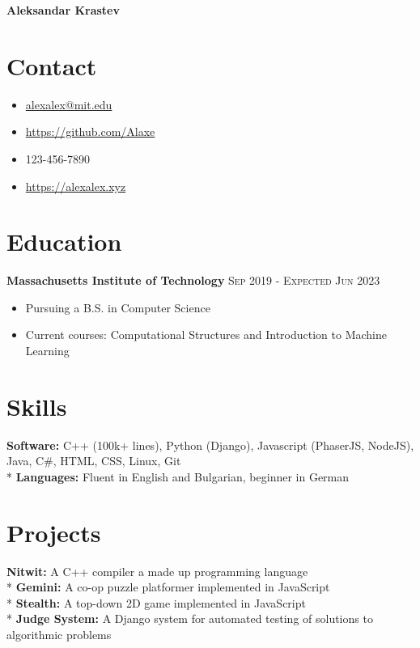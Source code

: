 \documentclass[letterpaper,11pt]{article}
\author{Aleksandar Krastev}
\date{2019-09-03}
\newcommand{\noskip}{\vspace{-\parskip}}
\begin{document}
\centerline{{\Huge \bf Aleksandar Krastev}}
\section*{Contact}
\noskip
\begin{multicols}{2}
\begin{itemize}
    \item \href{mailto:alexalex@mit.edu}{alexalex@mit.edu}
    \item \href{https://github.com/Alaxe}{https://github.com/Alaxe}
    \item 123-456-7890
    \item \href{https://alexalex.xyz}{https://alexalex.xyz}
\end{itemize}
\end{multicols}
\noskip
\section*{Education}
\textbf{Massachusetts Institute of Technology}
\hfill
\textsc{Sep 2019 - Expected Jun 2023}

\noskip
\begin{itemize}
    \item Pursuing a B.S. in Computer Science
    \item Current courses: Computational Structures and Introduction to Machine
        Learning
\end{itemize}

\section*{Skills}
\textbf{Software:} C++ (100k+ lines), Python (Django), Javascript
    (PhaserJS, NodeJS), Java, C\#, HTML, CSS, Linux, Git\\*
\textbf{Languages:} Fluent in English and Bulgarian, beginner in German

\section*{Projects}
\textbf{Nitwit:} A C++ compiler a made up programming language\\*
\textbf{Gemini:} A co-op puzzle platformer implemented in JavaScript\\*
\textbf{Stealth:} A top-down 2D game implemented in JavaScript\\*
\textbf{Judge System:} A Django system for automated testing of solutions to algorithmic problems
\end{document}
